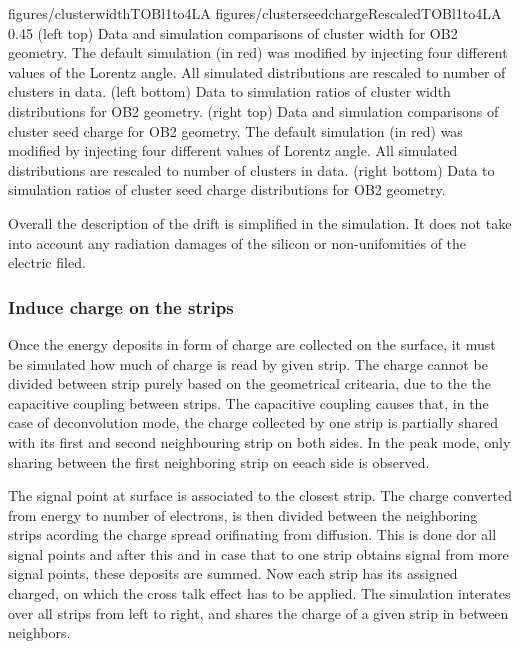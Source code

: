                  {figures/clusterwidthTOBl1to4LA}
                 {figures/clusterseedchargeRescaledTOBl1to4LA} %
                 {0.45}       %
                 {(left top) Data and simulation  comparisons of cluster width for OB2 geometry. The default simulation (in red) was modified by injecting four different values of the Lorentz angle. All simulated distributions are rescaled to number of clusters in data. (left bottom) Data to simulation ratios of cluster width distributions for OB2 geometry. (right top) Data and simulation  comparisons of cluster seed charge for OB2 geometry. The default simulation (in red) was modified by injecting four different values of Lorentz angle. All simulated distributions are rescaled to number of clusters in data. (right bottom) Data to simulation ratios of cluster seed charge distributions for OB2 geometry. }

Overall the description of the drift is simplified in the simulation. It does not take into account any radiation damages of the silicon or non-unifomities of the electric filed.

\subsubsection{Induce charge on the strips}

Once the energy deposits in form of charge are collected on the surface, it must be simulated how much of charge is read by given strip. The charge cannot be divided between strip purely based on the geometrical critearia, due to the the capacitive coupling between strips. The capacitive coupling causes that, in the case of deconvolution mode, the charge collected by one strip is partially shared with its first and second neighbouring strip on both sides. In the peak mode, only sharing between the first neighboring strip on eeach side is observed.   

The signal point at surface is associated to the closest strip. The charge converted from energy to number of electrons, is then divided between the neighboring strips acording the charge spread orifinating from diffusion. This is done dor all signal points and after this and in case that to one strip obtains signal from more signal points, these deposits are summed. Now each strip has its assigned charged, on which the cross talk effect has to be applied. The simulation interates over all strips from left to right, and shares the charge of a given strip in between neighbors.

